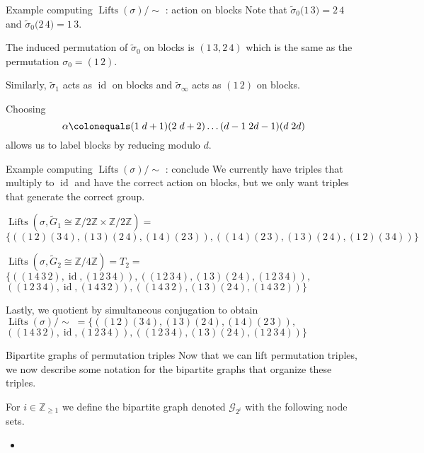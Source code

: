 \documentclass[xcolor=dvipsnames]{beamer}
\theoremstyle{plain}
\newcommand{\ZZ}{\mathbb Z}
\newcommand{\wt}[1]{\widetilde{#1}}
\DeclareMathOperator{\Lifts}{Lifts}
\DeclareMathOperator{\id}{id}
\begin{document}
{\begin{frame}{Example computing $\Lifts(\sigma)/\!\!\sim$ : action on blocks}
      Note that
      $\wt{\sigma}_0\Big(\boxed{1\,3}\Big) = \boxed{2\,4}$
      and
      $\wt{\sigma}_0\Big(\boxed{2\,4}\Big) = \boxed{1\,3}$.
      \pause\par
      The induced permutation
      of $\wt{\sigma}_0$ on blocks is
      $\left(\boxed{1\,3},\boxed{2\,4}\right)$
      which is the same as the
      permutation $\sigma_0 = (1\,2)$.
      \pause\par
      Similarly,
      $\wt{\sigma}_1$ acts as $\id$ on blocks
      and $\wt{\sigma}_\infty$ acts
      as $(1\,2)$ on blocks.
      \pause\par
      Choosing
      \[
        \alpha\colonequals
        (1\;d+1)(2\;d+2)\dots
        (d-1\;2d-1)(d\;2d)
      \]
      allows us to label blocks by reducing modulo $d$.
    \end{frame}
    \begin{frame}{Example computing $\Lifts(\sigma)/\!\!\sim$ : conclude}
      We currently have triples that multiply to $\id$
      and have the correct action on blocks,
      but we only want triples that
      generate the correct group.
      \pause\par
      $\Lifts(\sigma,\wt{G}_1\cong\ZZ/2\ZZ\times\ZZ/2\ZZ)=$
      $\Big\{ ((1\,2)(3\,4), (1\,3)(2\,4), (1\,4)(2\,3)),
      ((1\,4)(2\,3), (1\,3)(2\,4), (1\,2)(3\,4)) \Big\}$
      \pause\par
      $\Lifts(\sigma,\wt{G}_2\cong\ZZ/4\ZZ)=T_2=$
      $\Big\{ ((1\,4\,3\,2), \id, (1\,2\,3\,4)),
      ((1\,2\,3\,4), (1\,3)(2\,4), (1\,2\,3\,4)),$
      $((1\,2\,3\,4), \id, (1\,4\,3\,2)),
      ((1\,4\,3\,2), (1\,3)(2\,4), (1\,4\,3\,2)) \Big\}$
      \pause\par
      Lastly, we quotient by simultaneous conjugation to obtain
      $\Lifts(\sigma)/\!\!\sim \;=\Big\{
      ((1\,2)(3\,4),(1\,3)(2\,4),(1\,4)(2\,3)),$
      $((1\,4\,3\,2),\id,(1\,2\,3\,4)),
      ((1\,2\,3\,4),(1\,3)(2\,4),(1\,2\,3\,4)) \Big\}$
    \end{frame}
    \begin{frame}{Bipartite graphs of permutation triples}
      Now that we can lift permutation triples,
      we now describe some notation for the bipartite
      graphs that organize these triples.
      \pause\par
      For $i\in\ZZ_{\geq 1}$ we define the bipartite
      graph denoted $\mathscr{G}_{2^i}$ with the following
      node sets.
      \begin{itemize}
        \item

\end{itemize}
\end{frame}}
\end{document}

